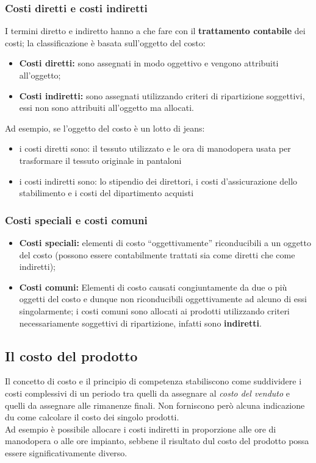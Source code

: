 \documentclass{article}
\begin{document}
\subsubsection{Costi diretti e costi indiretti}
I termini diretto e indiretto hanno a che fare con il \textbf{trattamento contabile} dei costi; la classificazione è basata sull'oggetto del costo:
\begin{itemize}
    \item \textbf{Costi diretti:} sono assegnati in modo oggettivo e vengono attribuiti all'oggetto;
    \item  \textbf{Costi indiretti:} sono assegnati utilizzando criteri di ripartizione soggettivi, essi non sono attribuiti all'oggetto ma allocati.
\end{itemize}
Ad esempio, se l'oggetto del costo è un lotto di jeans:
\begin{itemize}
    \item i costi diretti sono: il tessuto utilizzato e le ora di manodopera usata per trasformare il tessuto originale in pantaloni
    \item i costi indiretti sono: lo stipendio dei direttori, i costi d'assicurazione dello stabilimento e i costi del dipartimento acquisti 
\end{itemize}


\subsubsection{Costi speciali e costi comuni}
\begin{itemize}
    \item \textbf{Costi speciali:} elementi di costo “oggettivamente” riconducibili a un oggetto del costo
    (possono essere contabilmente trattati sia come diretti che come indiretti);
    \item \textbf{Costi comuni:} Elementi di costo causati congiuntamente da due o più oggetti del costo e dunque non riconducibili oggettivamente ad alcuno di essi singolarmente; i costi comuni sono allocati ai prodotti utilizzando criteri necessariamente soggettivi di ripartizione, infatti sono \textbf{indiretti}.
\end{itemize}



\subsection{Il costo del prodotto}
Il concetto di costo e il principio di competenza stabiliscono come suddividere i costi complessivi di un periodo tra quelli da assegnare al \textit{costo del venduto} e quelli da assegnare alle rimanenze finali. Non forniscono però alcuna indicazione du come calcolare il costo dei singolo prodotti.\\
Ad esempio è possibile allocare i costi indiretti in proporzione alle ore di manodopera o alle ore impianto, sebbene il risultato dul costo del prodotto possa essere significativamente diverso.
\end{document}
